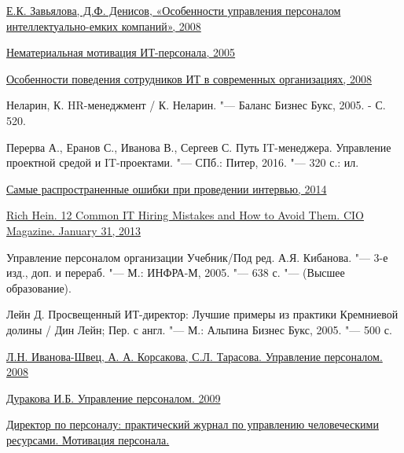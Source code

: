 \documentclass{../industrial-development}
\begin{document}
\begin{thebibliography}{99}
		 \href{https://cyberleninka.ru/article/v/osobennosti-upravleniya-personalom-intellektualno-emkih-kompaniy}{Е.К. Завьялова, Д.Ф. Денисов, «Особенности управления персоналом интеллектуально-емких компаний», 2008}
		
		 \href{http://hr-portal.ru/article/nematerialnaya-motivaciya-it-personala
		}{Нематериальная мотивация ИТ-персонала, 2005}
		
		
		 \href{http://www.0ck.ru/menedzhment_i_trudovye_otnosheniya/osobennosti_povedeniya_sotrudnikov_it_v.html}{Особенности поведения сотрудников ИТ в современных организациях, 2008}
		
		 Неларин, К. HR-менеджмент / К. Неларин. "--- Баланс Бизнес Букс, 2005. - С. 520.
		
		 Перерва А., Еранов С., Иванова В., Сергеев С. Путь IT-менеджера. Управление проектной средой и IT-проектами. "--- СПб.: Питер, 2016. "--- 320 с.: ил.
		
		 \href{http://bishelp.ru/business/personal/samye-rasprostranennye-oshibki-pri-provedenii-intervyu}{Самые распространенные ошибки при проведении интервью, 2014}
		
		 \href{https://www.osp.ru/cio/2013/08/13036953/}{Rich Hein. 12 Common IT Hiring Mistakes and How to Avoid Them. CIO Magazine. January 31, 2013}
		
		 Управление персоналом организации Учебник/Под ред. А.Я. Кибанова. "--- 3-е изд., доп. и перераб. "--- М.: ИНФРА-М, 2005. "--- 638 с. "--- (Высшее образование).
		
		 Лейн Д. Просвещенный ИТ-директор: Лучшие примеры из практики Кремниевой долины / Дин Лейн; Пер. с англ. "--- М.: Альпина Бизнес Букс, 2005. "--- 500 с.
		
		 \href{http://finances.social/upravlenie-personalom_709/modeli-upravleniya-personalom-33032.html} {Л.Н. Иванова-Швец, А. А. Корсакова, С.Л. Тарасова. Управление персоналом. 2008}
		
		 \href{https://textbooks.studio/menedjment-upravlenie-personalom/osnovnyie-elementyi-planirovaniya-26893.html}{Дуракова И.Б. Управление персоналом. 2009}
		
		 \href{https://www.hr-director.ru/rubric/6507-motivatsiya-personala}{Директор по персоналу: практический журнал по управлению человеческими ресурсами. Мотивация персонала.}
		

\end{thebibliography}
\end{document}

